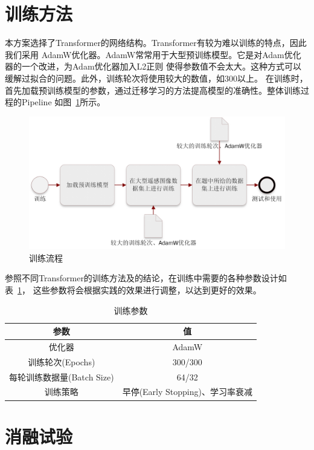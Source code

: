 \documentclass[a4paper,twoside,zihao=5,UTF8]{ctexrep}
\begin{document}
\section{训练方法}
本方案选择了Transformer的网络结构。Transformer有较为难以训练的特点，因此我们采用
AdamW优化器。AdamW常常用于大型预训练模型。它是对Adam优化器的一个改进，为Adam优化器加入L2正则
使得参数值不会太大。这种方式可以缓解过拟合的问题。此外，训练轮次将使用较大的数值，如300以上。
在训练时，首先加载预训练模型的参数，通过迁移学习的方法提高模型的准确性。整体训练过程的Pipeline
如图~\ref{fig:trainpipe}所示。

\begin{figure}[htbp]
    \includegraphics[width=\textwidth]{train.png}
    \centering
    \caption{训练流程}
    \label{fig:trainpipe}
\end{figure}

参照不同Transformer的训练方法及\cite{howtotrain}的结论，在训练中需要的各种参数设计如表~\ref{tbl:train}，
这些参数将会根据实践的效果进行调整，以达到更好的效果。

\begin{table}[htbp]
    \centering
    \caption{训练参数}
    \label{tbl:train}
    \renewcommand\arraystretch{1.5}
    \begin{tabular}{c|c}
        \toprule
        \hline
        参数 & 值 \\
        \hline
        优化器 & AdamW \\
        训练轮次(Epochs) & 300/300 \\
        每轮训练数据量(Batch Size) & 64/32 \\
        训练策略 & 早停(Early Stopping)、学习率衰减 \\
        \hline
        \bottomrule
    \end{tabular}
\end{table}

\section{消融试验}
\end{document}
